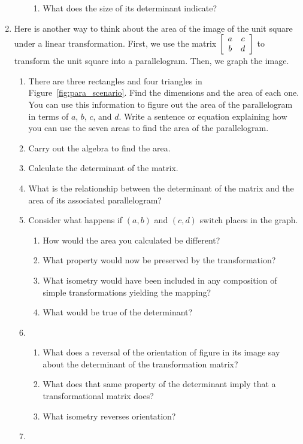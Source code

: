 \documentclass[../gatm.tex]{subfiles}
\begin{document}
\begin{enumerate}
\begin{enumerate}
\begin{enumerate}
\item What does the size of its determinant indicate?
\end{enumerate}
\end{enumerate}
\item Here is another way to think about the area of the image of the unit square under a linear transformation. First, we use the matrix $\left[\begin{array}{cc} a & c \\ b & d \end{array}\right]$ to transform the unit square into a parallelogram. Then, we graph the image. \label{prob:unit_square_into_parallelogram}
\begin{enumerate}
\item There are three rectangles and four triangles in Figure~\ref{fig:para_scenario}. Find the dimensions and the area of each one. You can use this information to figure out the area of the parallelogram in terms of $a$, $b$, $c$, and $d$. Write a sentence or equation explaining how you can use the seven areas to find the area of the parallelogram.
\item Carry out the algebra to find the area.
\item Calculate the determinant of the matrix.
\item What is the relationship between the determinant of the matrix and the area of its associated parallelogram?
\item Consider what happens if $(a,b)$ and $(c,d)$ switch places in the graph.
\begin{enumerate}
\item How would the area you calculated be different?
\item What property would now be preserved by the transformation?
\item What isometry would have been included in any composition of simple transformations yielding the mapping?
\item What would be true of the determinant?
\end{enumerate}
\item \begin{enumerate}
\item What does a reversal of the orientation of figure in its image say about the determinant of the transformation matrix?
\item What does that same property of the determinant imply that a transformational matrix does?
\item What isometry reverses orientation?
\end{enumerate}
\item \begin{enumerate}

\end{enumerate}
\end{enumerate}
\end{enumerate}
\end{document}
